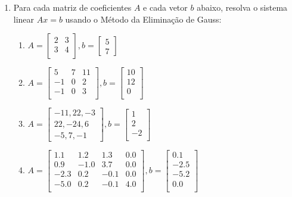 \documentclass[a4paper]{article}
\begin{document}
\begin{enumerate}
\item Para cada matriz de coeficientes $A$ e cada vetor $b$ abaixo,
  resolva o sistema linear $Ax=b$ usando o Método da Eliminação de
  Gauss:
  \begin{enumerate}
  \item 
    $A = \begin{bmatrix}
        2 & 3\\
        3 & 4\\
      \end{bmatrix},
      b= \begin{bmatrix}
        5\\
        7
      \end{bmatrix}$

  \item
    $A = \begin{bmatrix}
      5 & 7 & 11\\
      -1 & 0 & 2\\
      -1 & 0 & 3\\
      \end{bmatrix},
      b= \begin{bmatrix}
        10\\
        12\\
        0\\
      \end{bmatrix}$

  \item
    $A = \begin{bmatrix}
      -11, 22, -3\\
      22, -24, 6\\
      -5, 7, -1
      \end{bmatrix},
      b= \begin{bmatrix}
        1\\
        2\\
        -2\\
      \end{bmatrix}$

  \item
    $A = \begin{bmatrix}
      1.1 & 1.2 & 1.3 & 0.0\\
      0.9 & -1.0 & 3.7 & 0.0\\
      -2.3 & 0.2 & -0.1 & 0.0\\
      -5.0 & 0.2 & -0.1 & 4.0\\
      \end{bmatrix},
      b= \begin{bmatrix}
        0.1\\
        -2.5\\
        -5.2\\
        0.0\\
      \end{bmatrix}$


\end{enumerate}
\end{enumerate}
\end{document}

